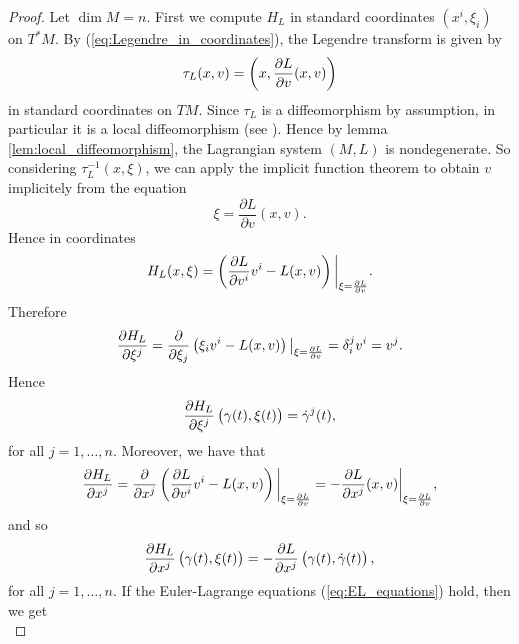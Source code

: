 \begin{proof}
	Let $\dim M = n$. First we compute $H_L$ in standard coordinates $(x^i,\xi_i)$ on $T^*M$. By (\ref{eq:Legendre_in_coordinates}), the Legendre transform is given by
	\begin{equation}
		\tau_L(x,v) = \del[3]{x,\frac{\partial L}{\partial v}(x,v)}
	\end{equation}
	\noindent in standard coordinates on $TM$. Since $\tau_L$ is a diffeomorphism by assumption, in particular it is a local diffeomorphism (see \cite[80]{lee:smooth_manifolds:2013}). Hence by lemma \ref{lem:local_diffeomorphism}, the Lagrangian system $(M,L)$ is nondegenerate. So considering $\tau^{-1}_L(x,\xi)$, we can apply the implicit function theorem \cite[661]{lee:smooth_manifolds:2013} to obtain $v$ implicitely from the equation
	\begin{equation*}
		\xi = \frac{\partial L}{\partial v}(x,v).
	\end{equation*}
	Hence in coordinates
	\begin{equation*}
		H_L(x,\xi) = \del[3]{\frac{\partial L}{\partial v^i}v^i - L(x,v)}\bigg\vert_{\xi = \frac{\partial L}{\partial v}}.
	\end{equation*}
	Therefore
	\begin{equation*}
		\frac{\partial H_L}{\partial \xi^j} = \frac{\partial}{\partial \xi_j} \del[1]{\xi_i v^i - L(x,v)}\big\vert_{\xi = \frac{\partial L}{\partial v}} = \delta^j_i v^i = v^j.
	\end{equation*}
	Hence
	\begin{equation*}
		\frac{\partial H_L}{\partial \xi^j}\del[1]{\gamma(t),\xi(t)} = \dot{\gamma}^j(t),
	\end{equation*}
	\noindent for all $j = 1,\dots,n$. Moreover, we have that
	\begin{equation*}
		\frac{\partial H_L}{\partial x^j} = \frac{\partial}{\partial x^j}\del[3]{\frac{\partial L}{\partial v^i}v^i - L(x,v)}\bigg\vert_{\xi = \frac{\partial L}{\partial v}} = - \frac{\partial L}{\partial x^j}(x,v)\bigg\vert_{\xi = \frac{\partial L}{\partial v}}, 
	\end{equation*}
	\noindent and so
	\begin{equation*}
		\frac{\partial H_L}{\partial x^j}\del[1]{\gamma(t),\xi(t)} = -\frac{\partial L}{\partial x^j}\del[1]{\gamma(t),\dot{\gamma}(t)},
	\end{equation*}
	\noindent for all $j = 1,\dots,n$. If the Euler-Lagrange equations (\ref{eq:EL_equations}) hold, then we get
	\begin{equation*}

\end{equation*}
\end{proof}
